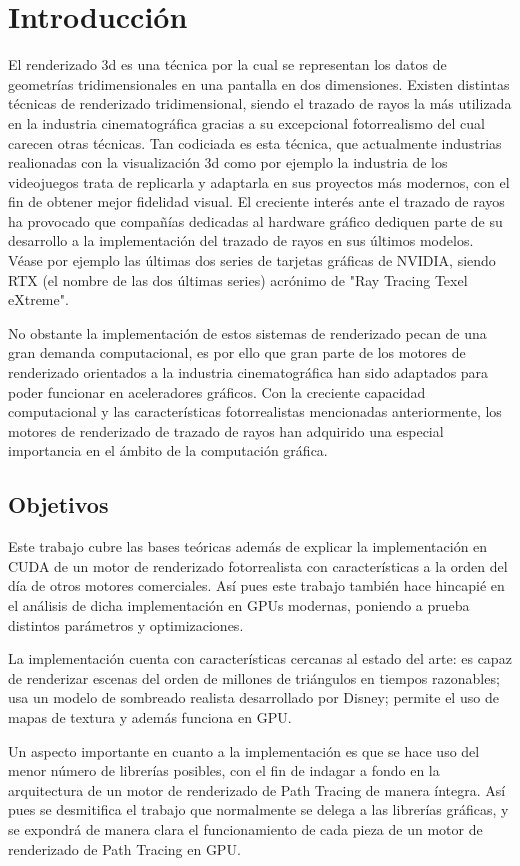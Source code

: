 \chapter{Introducción}
	
El renderizado 3d es una técnica por la cual se representan los datos de geometrías tridimensionales en una pantalla en dos dimensiones. Existen distintas técnicas de renderizado tridimensional, siendo el trazado de rayos la más utilizada en la industria cinematográfica gracias a su excepcional fotorrealismo del cual carecen otras técnicas. Tan codiciada es esta técnica, que actualmente industrias realionadas con la visualización 3d como por ejemplo la industria de los videojuegos trata de replicarla y adaptarla en sus proyectos más modernos, con el fin de obtener mejor fidelidad visual.
El creciente interés ante el trazado de rayos ha provocado que compañías dedicadas al hardware gráfico dediquen parte de su desarrollo a la implementación del trazado de rayos en sus últimos modelos. Véase por ejemplo las últimas dos series de tarjetas gráficas de NVIDIA, siendo RTX (el nombre de las dos últimas series) acrónimo de "Ray Tracing Texel eXtreme". 

No obstante la implementación de estos sistemas de renderizado pecan de una gran demanda computacional, es por ello que gran parte de los motores de renderizado orientados a la industria cinematográfica han sido adaptados para poder funcionar en aceleradores gráficos. Con la creciente capacidad computacional y las características fotorrealistas mencionadas anteriormente, los motores de renderizado de trazado de rayos han adquirido una especial importancia en el ámbito de la computación gráfica.



\section{Objetivos}

Este trabajo cubre las bases teóricas además de explicar la implementación en CUDA de un motor de renderizado fotorrealista con características a la orden del día de otros motores comerciales. Así pues este trabajo también hace hincapié en el análisis de dicha implementación en GPUs modernas, poniendo a prueba distintos parámetros y optimizaciones.

La implementación cuenta con características cercanas al estado del arte: es capaz de renderizar escenas del orden de millones de triángulos en tiempos razonables; usa un modelo de sombreado realista desarrollado por Disney; permite el uso de mapas de textura y además funciona en GPU.

Un aspecto importante en cuanto a la implementación es que se hace uso del menor número de librerías posibles, con el fin de indagar a fondo en la arquitectura de un motor de renderizado de Path Tracing de manera íntegra. Así pues se desmitifica el trabajo que normalmente se delega a las librerías gráficas, y se expondrá de manera clara el funcionamiento de cada pieza de un motor de renderizado de Path Tracing en GPU.
